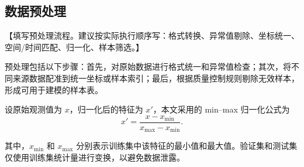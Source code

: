 \subsection{数据预处理}

【填写预处理流程。建议按实际执行顺序写：格式转换、异常值剔除、坐标统一、空间/时间匹配、归一化、样本筛选。】

预处理包括以下步骤：首先，对原始数据进行格式统一和异常值检查；其次，将不同来源数据配准到统一坐标或样本索引；最后，根据质量控制规则剔除无效样本，形成可用于建模的样本表。

设原始观测值为 $x$，归一化后的特征为 $x'$，本文采用的 min--max 归一化公式为
\begin{equation}
x' = \frac{x - x_{\min}}{x_{\max} - x_{\min}}.
\end{equation}

其中，$x_{\min}$ 和 $x_{\max}$ 分别表示训练集中该特征的最小值和最大值。验证集和测试集仅使用训练集统计量进行变换，以避免数据泄露。
